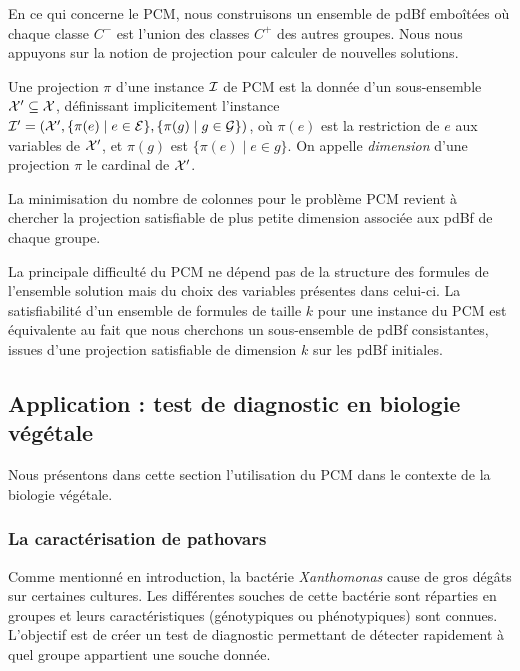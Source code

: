 En ce qui concerne le PCM, nous construisons un ensemble de pdBf emboîtées où
chaque classe ${C}^{-}$ est l'union des classes ${C}^{+}$ des autres groupes.
Nous nous appuyons sur la notion de projection pour calculer de nouvelles
solutions.

\begin{definition}[Projection]
Une projection $\pi$ d'une instance ${\cal I}$ de PCM est la donnée d'un
sous-ensemble ${\cal X'} \subseteq {\cal X}$, définissant implicitement
l'instance ${\cal I'} = ({\cal X'},\{\pi(e) \mid e \in  {\cal E} \},\{ \pi(g)
\mid g \in {\cal G}\})$, où $\pi(e)$ est la restriction de $e$ aux variables de
${\cal X'}$, et $\pi(g)$ est $\{\pi(e)\mid e\in g\}$. On appelle
\emph{dimension} d'une projection $\pi$  le cardinal de ${\cal X'}$.
\end{definition}

La minimisation du nombre de colonnes pour le problème PCM revient à chercher la
projection satisfiable de plus petite dimension associée aux pdBf de chaque
groupe.

La principale difficulté du PCM ne dépend pas de la structure des formules de
l'ensemble solution mais du choix des variables présentes dans celui-ci. La
satisfiabilité d'un ensemble de formules de taille $k$  pour une instance du PCM est équivalente au fait que nous cherchons un sous-ensemble de pdBf consistantes, issues d'une projection satisfiable de dimension $k$ sur les pdBf initiales.

\subsection{Application : test de diagnostic en biologie végétale}

Nous présentons dans cette section l'utilisation du PCM dans le contexte de la biologie végétale.

\subsubsection{La caractérisation de pathovars}

Comme mentionné en introduction, la bactérie {\em Xanthomonas}  cause de gros
dégâts sur certaines cultures. Les différentes souches de cette bactérie sont
réparties en groupes et leurs caractéristiques (génotypiques ou phénotypiques)
sont connues. L'objectif est de créer un test de diagnostic permettant de
détecter rapidement à quel groupe appartient une souche donnée.

